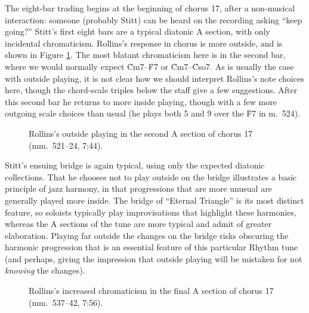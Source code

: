 The eight-bar trading begins at the beginning of chorus 17, after a
non-musical interaction: someone (probably Stitt) can be heard on the
recording asking ``keep going?'' Stitt's first eight bars are a typical
diatonic A section, with only incidental chromaticism. Rollins's response in
chorus  is more outside, and is shown in Figure
\ref{et:sr-outside-17a2}. The most blatant chromaticism here is in the second
bar, where we would normally expect \h{Cm7}--\h{F7} or \h{Cm7}--\h{Cso7}. As
is usually the case with outside playing, it is not clear how we should
interpret Rollins's note choices here, though the chord-scale triples below
the staff give a few suggestions. After this second bar he returns to more
inside playing, though with a few more outgoing scale choices than usual (he
plays both \sharp{}5 and \flat{}9 over the \h{F7} in m.~524).

\begin{figure}[tbp]
  \caption[Rollins's outside playing in the second A section of chorus 17.]{%
    Rollins's outside playing in the second A section of chorus 17
    (mm.~521--24, 7:44).}
  \label{et:sr-outside-17a2}
\end{figure}

Stitt's ensuing bridge is again typical, using only the expected diatonic
collections. That he chooses not to play outside on the bridge illustrates a
basic principle of jazz harmony, in that progressions that are more unusual are
generally played more inside. The bridge of ``Eternal Triangle'' is its most
distinct feature, so soloists typically play improvisations that highlight
these harmonies, whereas the A sections of the tune are more typical and admit
of greater elaboration. Playing far outside the changes on the bridge risks
obscuring the harmonic progression that is an essential feature of this
particular Rhythm tune (and perhaps, giving the impression that outside
playing will be mistaken for not \emph{knowing} the changes).

\begin{figure}[tbp]
  \caption[Rollins's increased chromaticism in the final A section of chorus
  17.]{%
    Rollins's increased chromaticism in the final A section of chorus 17
    (mm.~537--42, 7:56).}
  \label{et:sr-outside-17a3}
\end{figure}

